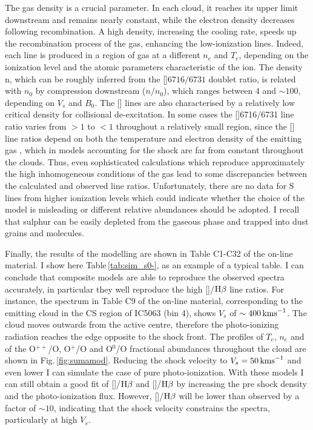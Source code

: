 \documentclass[../main.tex]{subfiles}
\begin{document}
The gas density is a crucial parameter. 
In each cloud, it reaches its upper limit downstream and remains nearly constant, while the electron density decreases following recombination. 
A high density, increasing the cooling rate, speeds up the recombination process of the gas, enhancing the low-ionization lines.
Indeed, each line is produced in a region of gas at a different $n_e$ and $T_e$, depending on the ionization level and the atomic parameters characteristic of the ion. 
The density n, which can be roughly inferred from the []$6716/6731$ doublet ratio, is related with $n_0$ by compression downstream ($n/n_0$), which ranges between $4$ and $\sim100$, depending on $V_s$ and $B_0$. 
The [] lines are also characterised by a relatively low critical density for collisional de-excitation.  
In some cases the []6716/6731 line ratio varies from $> 1$ to $< 1$ throughout a relatively small region, since the [] line ratios depend on both the temperature and electron density of the emitting gas \citep{OsterbrockAGN}, which in models accounting for the shock are far from constant throughout the clouds.
Thus, even sophisticated calculations which reproduce approximately the high inhomogeneous conditions of the gas
lead to some discrepancies between the calculated and observed line ratios.
Unfortunately, there are no data for S lines from higher ionization levels which could indicate whether the choice of the model is misleading or different relative abundances should be adopted. 
I recall that sulphur can be easily depleted from the gaseous phase and trapped into dust grains and molecules.

Finally, the results of the modelling are shown in Table C1-C32 of the on-line material.
I show here Table\,\ref{tab:sim_s0-}, as an example of a typical table. 
I can conclude that composite models are able to reproduce the observed spectra accurately, in particular they well reproduce the high []/$\Hb$ line ratios.
For instance, the spectrum in Table C9 of the on-line material, corresponding to the emitting cloud in the CS region of IC5063 (bin 4), shows $V_s$ of $\sim 400\,\si{\kms}$. 
The cloud moves outwards from the active centre, therefore the photo-ionizing radiation reaches the edge opposite to the shock front.
The profiles of $T_e$, $n_e$ and of the O$^{++}$/O, O$^+$/O and O$^0$/O fractional abundances throughout the cloud are shown in Fig.\,\ref{fig:sumamod}.
Reducing the shock velocity to $V_s =50\,\si{\kms}$ and even lower I can simulate the case of pure photo-ionization.
With these models I can still obtain a good fit of []/$\Hb$ and []/$\Hb$ by increasing the pre shock density and the photo-ionization flux.
However,  []/$\Hb$  will be lower than observed by a factor of $\sim 10$, indicating that the shock velocity constrains the spectra, particularly at high $V_s$.
\end{document}
